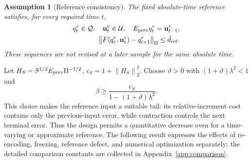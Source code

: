 \documentclass[journal]{IEEEtran}
\newtheorem{assumption}{Assumption}
\newcommand{\vu}{\mathbf{u}}
\newcommand{\norm}[1]{\left\lVert #1\right\rVert}
\begin{document}
\begin{assumption}[Reference consistency]
\label{ass:reference}
The fixed absolute-time reference satisfies, for every required time $t$,
\begin{equation}
\begin{split}
q_t^r\in\mathcal Q,\quad \vu_t^r\in\mathcal U,\quad
E_{\rm prev}q_t^r=\vu_{t-1}^r,\\
\norm{F(q_t^r,\vu_t^r)-q_{t+1}^r}_\Pi\le\bar d_{\rm ref}.
\end{split}
\label{eq:reference_defect}
\end{equation}
These sequences are not revised at a later sample for the same absolute time.
\end{assumption}

Let $H_S=S^{1/2}E_{\rm prev}\Pi^{-1/2}$, $c_S=1+\norm{H_S}_2^2$. Choose $\vartheta>0$ with $(1+\vartheta)\lambda^2<1$ and
\begin{equation}
\beta\ge\frac{c_S}{1-(1+\vartheta)\lambda^2}.
\label{eq:terminal_weight}
\end{equation}
This choice makes the reference input a suitable tail: its relative-increment cost contains only the previous-input error, while contraction controls the next terminal error. Thus the design permits a quantitative decrease even for a time-varying or approximate reference. The following result expresses the effects of re-encoding, freezing, reference defect, and numerical optimization separately; the detailed comparison constants are collected in Appendix~\ref{app:comparison}.
\end{document}
